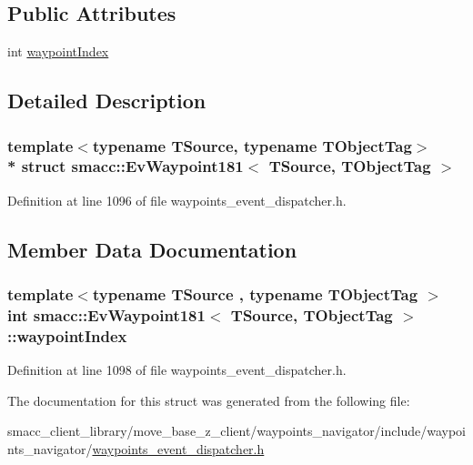 \subsection*{Public Attributes}
\begin{DoxyCompactItemize}
\item 
int \hyperlink{structsmacc_1_1EvWaypoint181_ae9e74ab6bf24b77ad0d0df4adad897a0}{waypoint\+Index}
\end{DoxyCompactItemize}


\subsection{Detailed Description}
\subsubsection*{template$<$typename T\+Source, typename T\+Object\+Tag$>$\\*
struct smacc\+::\+Ev\+Waypoint181$<$ T\+Source, T\+Object\+Tag $>$}



Definition at line 1096 of file waypoints\+\_\+event\+\_\+dispatcher.\+h.



\subsection{Member Data Documentation}
\subsubsection[{\texorpdfstring{waypoint\+Index}{waypointIndex}}]{\setlength{\rightskip}{0pt plus 5cm}template$<$typename T\+Source , typename T\+Object\+Tag $>$ int {\bf smacc\+::\+Ev\+Waypoint181}$<$ T\+Source, T\+Object\+Tag $>$\+::waypoint\+Index}\hypertarget{structsmacc_1_1EvWaypoint181_ae9e74ab6bf24b77ad0d0df4adad897a0}{}\label{structsmacc_1_1EvWaypoint181_ae9e74ab6bf24b77ad0d0df4adad897a0}


Definition at line 1098 of file waypoints\+\_\+event\+\_\+dispatcher.\+h.



The documentation for this struct was generated from the following file\+:\begin{DoxyCompactItemize}
\item 
smacc\+\_\+client\+\_\+library/move\+\_\+base\+\_\+z\+\_\+client/waypoints\+\_\+navigator/include/waypoints\+\_\+navigator/\hyperlink{waypoints__event__dispatcher_8h}{waypoints\+\_\+event\+\_\+dispatcher.\+h}\end{DoxyCompactItemize}
